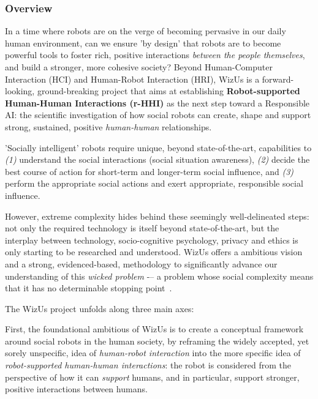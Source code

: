 \documentclass[11pt]{article}
\newcommand{\project}{WizUs\xspace}
\begin{document}
\subsubsection{Overview}

In a time where robots are on the verge of becoming pervasive in our daily human
environment, can we ensure 'by design' that robots are to become powerful tools
to foster rich, positive interactions \emph{between the people themselves}, and
build a stronger, more cohesive society? Beyond Human-Computer Interaction (HCI)
and Human-Robot Interaction (HRI), \project is a forward-looking,
ground-breaking project that aims at establishing \textbf{Robot-supported
Human-Human Interactions (r-HHI)} as the next step toward a Responsible AI: the
scientific investigation of how social robots can create, shape and support
strong, sustained, positive \emph{human-human} relationships.

'Socially intelligent' robots require unique, beyond state-of-the-art,
capabilities to \emph{(1)} understand the social interactions (social
situation awareness), \emph{(2)} decide the best course of action for
short-term and longer-term social influence, and \emph{(3)} perform the
appropriate social actions and exert appropriate, responsible social influence.

However, extreme complexity hides behind these seemingly well-delineated steps:
not only the required technology is itself beyond state-of-the-art, but the
interplay between technology, socio-cognitive psychology, privacy and ethics is
only starting to be researched and understood. \project offers a ambitious
vision and a strong, evidenced-based, methodology to significantly advance our
understanding of this \emph{wicked problem} -– a problem whose social complexity
means that it has no determinable stopping point~\cite{tonkinwise2015design}.

The \project project unfolds along three main axes:

First, the foundational ambitious of \project is to create a conceptual
framework around social robots in the human society, by reframing the widely
accepted, yet sorely unspecific, idea of \emph{human-robot interaction} into the
more specific idea of \emph{robot-supported human-human interactions}: the robot
is considered from the perspective of how it can \emph{support} humans, and in
particular, support stronger, positive interactions between humans.
\end{document}
